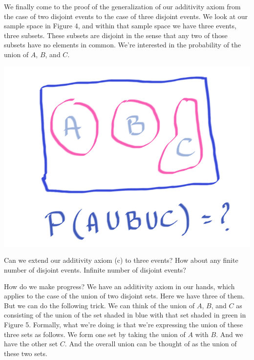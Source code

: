 \documentclass{tufte-handout}
\begin{document}
We finally come to the proof of the generalization of our additivity axiom from the case of two disjoint
events to the case of three disjoint events. We look at our sample space in Figure 4, and within that sample space
we have three events, three subsets. These subsets are disjoint in the sense that any two of those
subsets have no elements in common. We're interested in the probability of the union of $A$, $B$, and
$C$.

\begin{marginfigure}
  \includegraphics{UnionThree}
  \caption{Can we extend our additivity axiom (c) to three events? How about any finite number of disjoint events. Infinite number of disjoint events?}
\end{marginfigure}


How do we make progress? We have an additivity axiom in our hands, which applies to the case of the
union of two disjoint sets. Here we have three of them. But we can do the following trick. We can think
of the union of $A$, $B$, and $C$ as consisting of the union of the set shaded in blue with that set shaded 
in green in Figure 5. Formally, what
we're doing is that we're expressing the union of these three sets as follows. We form one set by taking
the union of $A$ with $B$. And we have the other set $C$. And the overall union can be thought of as the
union of these two sets.
\end{document}

